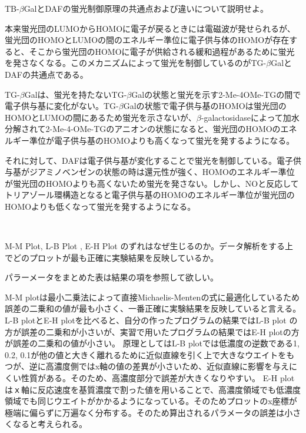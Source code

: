 \documentclass[a4paper,papersize,dvipdfmx]{jsarticle}
\begin{document}
\begin{tcolorbox}[colback=white,colbacktitle=black,coltitle=white,title={2. }]
TB-$\beta$GalとDAFの蛍光制御原理の共通点および違いについて説明せよ。
\end{tcolorbox}

本来蛍光団のLUMOからHOMOに電子が戻るときには電磁波が発せられるが、蛍光団のHOMOとLUMOの間のエネルギー準位に電子供与体のHOMOが存在すると、そこから蛍光団のHOMOに電子が供給される緩和過程があるために蛍光を発さなくなる。このメカニズムによって蛍光を制御しているのがTG-$\beta$GalとDAFの共通点である。

TG-$\beta$Galは、蛍光を持たないTG-$\beta$Galの状態と蛍光を示す2-Me-4OMe-TGの間で電子供与基に変化がない。TG-$\beta$Galの状態で電子供与基のHOMOは蛍光団のHOMOとLUMOの間にあるため蛍光を示さないが、$\beta$-galactosidaseによって加水分解されて2-Me-4-OMe-TGのアニオンの状態になると、蛍光団のHOMOのエネルギー準位が電子供与基のHOMOよりも高くなって蛍光を発するようになる。

それに対して、DAFは電子供与基が変化することで蛍光を制御している。電子供与基がジアミノベンゼンの状態の時は還元性が強く、HOMOのエネルギー準位が蛍光団のHOMOよりも高くないため蛍光を発さない。しかし、NOと反応してトリアゾール環構造となると電子供与基のHOMOのエネルギー準位が蛍光団のHOMOよりも低くなって蛍光を発するようになる。

\

\begin{tcolorbox}[colback=white,colbacktitle=black,coltitle=white,title={3.}]
 M-M Plot, L-B Plot , E-H Plot のずれはなぜ生じるのか。データ解析をする上でどのプロットが最も正確に実験結果を反映しているか。
\end{tcolorbox}

パラーメータをまとめた表は結果の項を参照して欲しい。

M-M plotは最小二乗法によって直接Michaelis-Mentenの式に最適化しているため誤差の二乗和の値が最も小さく、一番正確に実験結果を反映していると言える。
L-B plotとE-H plotを比べると、自分の作ったプログラムの結果ではL-B plot の方が誤差の二乗和が小さいが、実習で用いたプログラムの結果ではE-H plotの方が誤差の二乗和の値が小さい。
原理としてはL-B plotでは低濃度の逆数である1, 0.2, 0.1が他の値と大きく離れるために近似直線を引く上で大きなウエイトをもつが、逆に高濃度側ではx軸の値の差異が小さいため、近似直線に影響を与えにくい性質がある。そのため、高濃度部分で誤差が大きくなりやすい。
E-H plotはｘ軸に反応速度を基質濃度で割った値を用いることで、高濃度領域でも低濃度領域でも同じウエイトがかかるようになっている。そのためプロットのx座標が極端に偏らずに万遍なく分布する。そのため算出されるパラメータの誤差は小さくなると考えられる。
\end{document}
